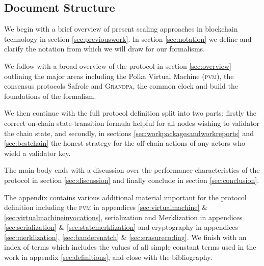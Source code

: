 \subsection{Document Structure}

We begin with a brief overview of present scaling approaches in blockchain technology in section \ref{sec:previouswork}. In section \ref{sec:notation} we define and clarify the notation from which we will draw for our formalisms.

We follow with a broad overview of the protocol in section \ref{sec:overview} outlining the major areas including the Polka Virtual Machine (\textsc{pvm}), the consensus protocols Safrole and \textsc{Grandpa}, the common clock and build the foundations of the formalism.

We then continue with the full protocol definition split into two parts: firstly the correct on-chain state-transition formula helpful for all nodes wishing to validator the chain state, and secondly, in sections \ref{sec:workpackagesandworkreports} and \ref{sec:bestchain} the honest strategy for the off-chain actions of any actors who wield a validator key.

The main body ends with a discussion over the performance characteristics of the protocol in section \ref{sec:discussion} and finally conclude in section \ref{sec:conclusion}.

The appendix contains various additional material important for the protocol definition including the \textsc{pvm} in appendices \ref{sec:virtualmachine} \& \ref{sec:virtualmachineinvocations}, serialization and Merklization in appendices \ref{sec:serialization} \& \ref{sec:statemerklization} and cryptography in appendices \ref{sec:merklization}, \ref{sec:bandersnatch} \& \ref{sec:erasurecoding}. We finish with an index of terms which includes the values of all simple constant terms used in the work in appendix \ref{sec:definitions}, and close with the bibliography.